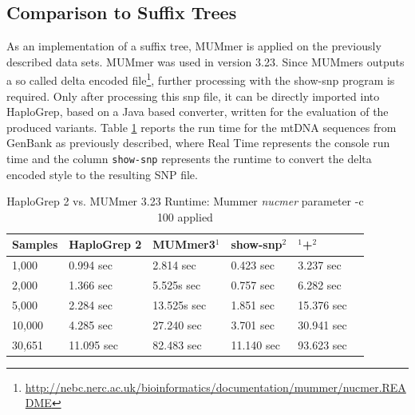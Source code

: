 \subsection{Comparison to Suffix Trees}
As an implementation of a suffix tree, MUMmer is applied on the previously described data sets. MUMmer was used in version 3.23. Since MUMmers outputs a so called delta encoded file\footnote{\url{http://nebc.nerc.ac.uk/bioinformatics/documentation/mummer/nucmer.README}}, further processing with the show-snp program is required. Only after processing this snp file, it can be directly imported into HaploGrep, based on a Java based converter, written for the evaluation of the produced variants. Table \ref{tableMummer} reports the run time for the mtDNA sequences from GenBank as previously described, where Real Time represents the console run time and the column \texttt{show-snp} represents the runtime to convert the delta encoded style to the resulting SNP file.  
\begin{table}[H]
\centering
\caption{HaploGrep 2 vs. MUMmer 3.23  Runtime: Mummer \textit{nucmer} parameter -c 100 applied }
\label{tableMummer}
\begin{tabular}{|l|l|l|l|l|l|}
\hline
\textbf{Samples} & \textbf{HaploGrep 2} & \textbf{MUMmer}3$^{1}$ &   \textbf{show-snp}$^{2}$ & $^1$+$^2$ \\ \hline
1,000  & 0.994 sec  & 2.814 sec  &     0.423 sec  &  3.237 sec
\\ \hline
2,000  & 1.366 sec  & 5.525s sec &     0.757 sec &  6.282 sec
\\ \hline
5,000  & 2.284 sec    & 13.525s sec &   1.851 sec &  15.376 sec
\\ \hline
10,000 & 4.285 sec  & 27.240 sec  &     3.701 sec & 30.941 sec
\\ \hline 
30,651   & 11.095 sec & 82.483 sec  &   11.140 sec &  93.623 sec
\\ \hline
\end{tabular}
\end{table}
